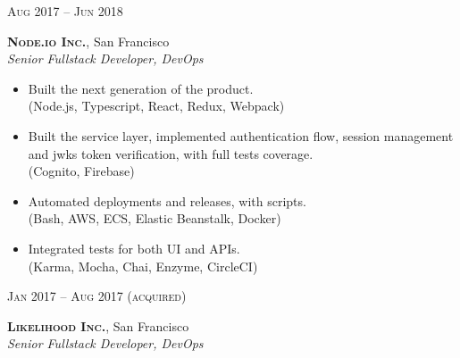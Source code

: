 \documentclass[10pt]{article}
\begin{document}
{\begin{minipage}[t]{0.5\textwidth}

{\raggedleft\textsc{Aug 2017 -- Jun 2018}\par}

{\raggedright\large \textbf{\textsc{Node.io Inc.}}, San Francisco\\
\textit{Senior Fullstack Developer, DevOps}\\[5pt]}

\begin{itemize}
	\item Built the next generation of the product. \\
	{\color{Mahogany}(Node.js, Typescript, React, Redux, Webpack)}
	\item Built the service layer, implemented authentication flow, session management and jwks token verification, with full tests coverage. \\
	{\color{Mahogany}(Cognito, Firebase)}
	\item Automated deployments and releases, with scripts. \\
	{\color{Mahogany}(Bash, AWS, ECS, Elastic Beanstalk, Docker)}
	\item Integrated tests for both UI and APIs. \\
	{\color{Mahogany}(Karma, Mocha, Chai, Enzyme, CircleCI)}
\end{itemize}

\end{minipage} %
\hfill
\begin{minipage}[t]{0.44\textwidth} %
\vspace{0pt} %


{\raggedleft\textsc{Jan 2017 -- Aug 2017  {\color{Mahogany}(acquired)}}\par}

{\raggedright\large \textbf{\textsc{Likelihood Inc.}}, San Francisco\\
\textit{Senior Fullstack Developer, DevOps}\\[5pt]}


\end{minipage}}
\end{document}
